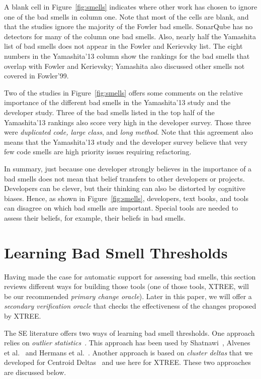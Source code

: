 \documentclass[twocolumn,5p]{elsarticle}
\newcommand{\fig}[1]{Figure~\ref{fig:#1}}
\theoremstyle{break}
\begin{document}
   
   


A  blank cell in \fig{smells}
indicates where   other work has chosen to ignore
one of the bad smells in column one. 
Note that most of the cells are blank, and that the studies ignore the majority of the Fowler bad smells.
SonarQube has no detectors for many of the column one bad smells.
Also, nearly half the Yamashita list of bad smells
    does not appear in the Fowler and Kerievsky list. The eight numbers
    in the  Yamashita'13 column show the rankings for the bad smells 
    that overlap with Fowler and Kerievsky; Yamashita also discussed other smells not covered in Fowler'99.
    

Two of the studies in \fig{smells} offers some comments on the relative importance
of the different bad smells in the Yamashita'13 study and the developer study. Three of the bad smells listed in the top half of the Yamashita'13 rankings also score very high in the developer survey. Those three were {\em duplicated code, large class}, 
        and {\em long method}. 
 Note that this agreement also means that the
  Yamashita'13 study and the developer survey   
  believe
        that very few  code smells are   high priority issues
        requiring refactoring. 
        
In summary, just because one developer strongly believes in the importance of a bad smells does not mean that belief transfers to other developers or projects.
Developers can be clever, but their thinking can also be distorted
by cognitive biases.
Hence, as shown in \fig{smells}, developers, text books, and tools 
can disagree on which bad smells are important.
Special tools are needed to assess their beliefs, for example, their beliefs in
bad smells.  
 

\section{Learning Bad Smell Thresholds}\label{sect:bst}

Having made the case for automatic support for assessing bad smells,
this section reviews different ways for building those tools (one of those tools,
XTREE, will be our recommended {\em primary change oracle}).
Later in this paper, we will offer  a {\em secondary verification oracle}
that checks the effectiveness of the changes proposed by XTREE.

The SE literature offers two ways of learning bad smell thresholds.
One approach relies on 
{\em outlier statistics}~\cite{erni96,bender99}. This approach
has been used   by Shatnawi~\cite{Shatnawi10}, Alvenes et al.~\cite{Alves2010}
    and Hermans et al.~\cite{hermans15}.
    Another approach is 
    based on {\em cluster deltas} that we developed
    for   Centroid Deltas~\cite{me12c} and 
    use here for XTREE. 
    These two approaches are discussed below. 
\end{document}

